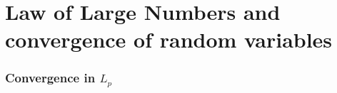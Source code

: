 

\part*{Law of Large Numbers and convergence of random variables}%

\section{Convergence in $L_p$}

